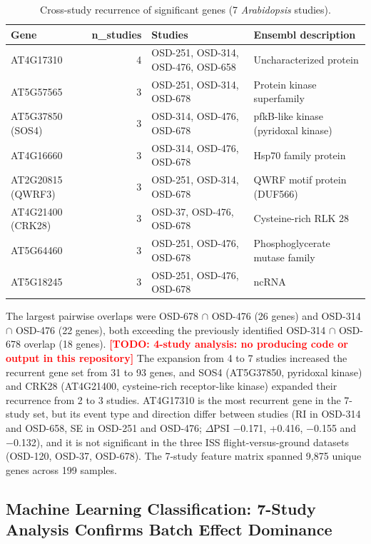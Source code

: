 \documentclass[12pt,a4paper]{article}
\newcommand{\TODO}[1]{\textcolor{red}{\textbf{[TODO: #1]}}}
\begin{document}
\begin{table}[h]
\centering
\caption{Cross-study recurrence of significant genes (7 \textit{Arabidopsis} studies).}
\label{tab:cross_study_recurrence}
\small
\begin{tabularx}{\textwidth}{lr>{\raggedright\arraybackslash}X>{\raggedright\arraybackslash}X}
\toprule
\textbf{Gene} & \textbf{n\_studies} & \textbf{Studies} & \textbf{Ensembl description} \\
\midrule
AT4G17310 & 4 & OSD-251, OSD-314, OSD-476, OSD-658 & Uncharacterized protein \\
AT5G57565 & 3 & OSD-251, OSD-314, OSD-678 & Protein kinase superfamily \\
AT5G37850 (SOS4) & 3 & OSD-314, OSD-476, OSD-678 & pfkB-like kinase (pyridoxal kinase) \\
AT4G16660 & 3 & OSD-314, OSD-476, OSD-678 & Hsp70 family protein \\
AT2G20815 (QWRF3) & 3 & OSD-251, OSD-314, OSD-678 & QWRF motif protein (DUF566) \\
AT4G21400 (CRK28) & 3 & OSD-37, OSD-476, OSD-678 & Cysteine-rich RLK 28 \\
AT5G64460 & 3 & OSD-251, OSD-476, OSD-678 & Phosphoglycerate mutase family \\
AT5G18245 & 3 & OSD-251, OSD-476, OSD-678 & ncRNA \\
\bottomrule
\end{tabularx}
\end{table}

The largest pairwise overlaps were OSD-678 $\cap$ OSD-476 (26 genes) and OSD-314 $\cap$ OSD-476 (22 genes), both exceeding the previously identified OSD-314 $\cap$ OSD-678 overlap (18 genes). \TODO{4-study analysis: no producing code or output in this repository} The expansion from 4 to 7 studies increased the recurrent gene set from 31 to 93 genes, and SOS4 (AT5G37850, pyridoxal kinase) and CRK28 (AT4G21400, cysteine-rich receptor-like kinase) expanded their recurrence from 2 to 3 studies. AT4G17310 is the most recurrent gene in the 7-study set, but its event type and direction differ between studies (RI in OSD-314 and OSD-658, SE in OSD-251 and OSD-476; $\Delta$PSI $-$0.171, +0.416, $-$0.155 and $-$0.132), and it is not significant in the three ISS flight-versus-ground datasets (OSD-120, OSD-37, OSD-678). The 7-study feature matrix spanned 9,875 unique genes across 199 samples.

\subsection{Machine Learning Classification: 7-Study Analysis Confirms Batch Effect Dominance}
\end{document}
